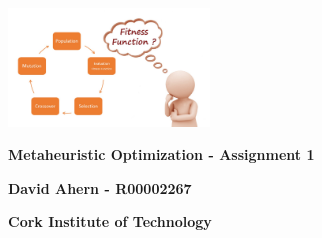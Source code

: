 \begin{titlepage}
    \begin{center}
    	\includegraphics[width=0.4\textwidth]{images/cover.jpeg}
    	
        \vspace*{1cm}
        
        \textbf{Metaheuristic Optimization - Assignment 1}
        
        \vspace{0.5cm}
        
        
        \vspace{1.5cm}
        
        \textbf{David Ahern - R00002267}
        
        \vspace{0.5cm}
        \textbf{Cork Institute of Technology}
        
    \end{center}
\end{titlepage}